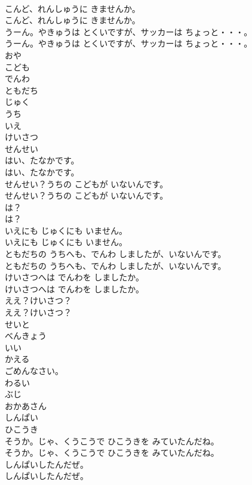 \documentclass[8pt]{extreport}
\begin{document}
\begin{CJK}{UTF8}{min}
\\	こんど、れんしゅうに きませんか。
\\	こんど、れんしゅうに きませんか。
\\	うーん。やきゅうは とくいですが、サッカーは ちょっと・・・。
\\	うーん。やきゅうは とくいですが、サッカーは ちょっと・・・。
\\	おや
\\	こども
\\	でんわ
\\	ともだち
\\	じゅく
\\	うち 
\\	いえ
\\	けいさつ
\\	せんせい
\\	はい、たなかです。
\\	はい、たなかです。
\\	せんせい？うちの こどもが いないんです。
\\	せんせい？うちの こどもが いないんです。
\\	は？
\\	は？
\\	いえにも じゅくにも いません。
\\	いえにも じゅくにも いません。
\\	ともだちの うちへも、でんわ しましたが、いないんです。
\\	ともだちの うちへも、でんわ しましたが、いないんです。
\\	けいさつへは でんわを しましたか。
\\	けいさつへは でんわを しましたか。
\\	ええ？けいさつ？
\\	ええ？けいさつ？
\\	せいと
\\	べんきょう
\\	いい
\\	かえる
\\	ごめんなさい。
\\	わるい
\\	ぶじ
\\	おかあさん
\\	しんぱい
\\	ひこうき
\\	そうか。じゃ、くうこうで ひこうきを みていたんだね。
\\	そうか。じゃ、くうこうで ひこうきを みていたんだね。
\\	しんぱいしたんだぜ。
\\	しんぱいしたんだぜ。

\end{CJK}
\end{document}
